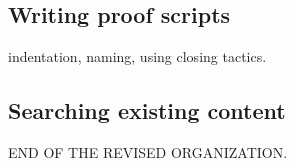 \subsection{Writing proof scripts}

indentation, naming, using closing tactics.

\subsection{Searching existing content}

END OF THE REVISED ORGANIZATION.

%
%
%
%
%
%
